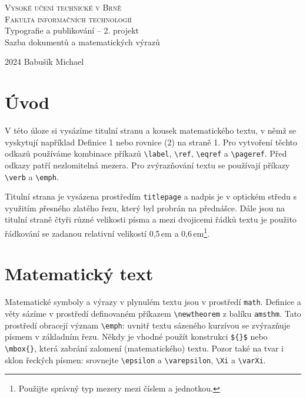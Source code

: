 \documentclass[11pt,a4paper,twocolumn]{article}
\begin{document}
\begin{titlepage}
    \begin{center}
        {\Huge\textsc{
        Vysoké učení technické v Brně \\
        {\huge Fakulta informačních technologií} \\
        }}
        {\LARGE
        Typografie a publikování -- 2. projekt \\ [0.6em]
        Sazba dokumentů a matematických výrazů
        }
    \end{center}

    {\Large 2024 \hfill Babušík Michael}
\end{titlepage}

\newpage

\section*{Úvod}
V této úloze si vysázíme titulní stranu a kousek matematického textu, v němž se vyskytují například Definice 1 nebo rovnice (2) na straně 1. Pro vytvoření
těchto odkazů používáme kombinace příkazů \texttt{\textbackslash label},
\texttt{\textbackslash ref}, \texttt{\textbackslash eqref} a \texttt{\textbackslash pageref}. Před odkazy patří nezlomitelná mezera. Pro zvýrazňování textu se používají
příkazy \texttt{\textbackslash verb} a \texttt{\textbackslash emph}.
\par
Titulní strana je vysázena prostředím \texttt{titlepage}
a nadpis je v optickém středu s využitím {\emph přesného} zlatého řezu, který byl probrán na přednášce. Dále jsou na titulní straně čtyři různé velikosti písma a mezi
dvojicemi řádků textu je použito řádkování se zadanou relativní velikostí 0,5\,em a 0,6\,em\footnote{Použijte správný typ mezery mezi číslem a jednotkou.}.

\section{Matematický text}
Matematické symboly a výrazy v plynulém textu jsou
v prostředí \texttt{math}. Definice a věty sázíme v prostředí
definovaném příkazem \texttt{\textbackslash newtheorem} z balíku \texttt{amsthm}.
Tato prostředí obracejí význam \texttt{\textbackslash emph}: uvnitř textu
sázeného kurzívou se zvýrazňuje písmem v základním řezu. Někdy je vhodné použít konstrukci \texttt{\$\{\}\$}
nebo \texttt{\textbackslash mbox\{\}}, která zabrání zalomení (matematického) textu. Pozor také na tvar i sklon řeckých písmen:
srovnejte \texttt{\textbackslash epsilon} a \texttt{\textbackslash varepsilon}, \texttt{\textbackslash Xi} a \texttt{\textbackslash varXi}.
\end{document}
